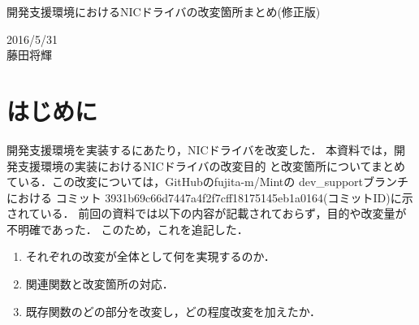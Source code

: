 \documentclass[12pt]{jsarticle}
\begin{document}

\begin{center}
    {\LARGE 開発支援環境におけるNICドライバの改変箇所まとめ(修正版)}
\end{center}

\begin{flushright}
    2016/5/31\\
    藤田将輝
\end{flushright}
\section{はじめに}
開発支援環境を実装するにあたり，NICドライバを改変した．
本資料では，開発支援環境の実装におけるNICドライバの改変目的
と改変箇所についてまとめている．この改変については，GitHubの\mbox{fujita-m/Mint}の
\mbox{dev\_support}ブランチにおける
コミット \mbox{3931b69c66d7447a4f2f7cff18175145eb1a0164}(コミットID)に示されている．
前回の資料では以下の内容が記載されておらず，目的や改変量が不明確であった．
このため，これを追記した．
\begin{enumerate}
    \item それぞれの改変が全体として何を実現するのか．
    \item 関連関数と改変箇所の対応．
    \item 既存関数のどの部分を改変し，どの程度改変を加えたか．
\end{enumerate}
\end{document}
